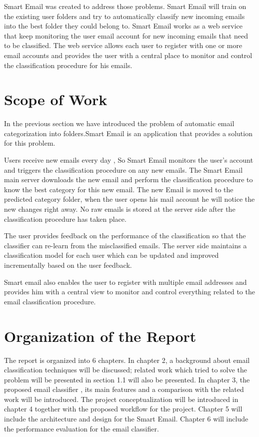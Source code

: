 	Smart Email was created to address those problems. Smart Email will train on the existing user folders and try to automatically classify new incoming emails into the best folder they could belong to. Smart Email works as a web service that keep monitoring the user email account for new incoming emails that need to be classified. The web service allows each user to register with one or more email accounts and provides the user with a central place to monitor and control the classification procedure for his emails.

\section{Scope of Work}

In the previous section we have introduced the problem of automatic email categorization into folders.Smart Email is an application that provides a solution for this problem.

Users receive new emails every day , So Smart Email monitors the user's account and triggers the classification procedure on any new emails. The Smart Email main server downloads the new email and perform the classification procedure to know the best category for this new email. The new Email is moved to the predicted category folder, when the user opens his mail account he will notice the new changes right away. No raw emails is stored at the server side after the classification procedure has taken place.

The user provides feedback on the performance of the classification so that the classifier can re-learn from the misclassified emails. The server side maintains a classification model for each user which can be updated and improved incrementally based on the user feedback.

	Smart email also enables the user to register with multiple email addresses and provides him with a central view to monitor and control everything related to the email classification procedure.


\section{Organization of the Report}

The report is organized into 6 chapters. In chapter 2, a background about email classification techniques will be discussed; related work which tried to solve the problem will be presented in section 1.1 will also be presented. In chapter 3, the proposed email classifier , its main features and a comparison with the related work will be introduced. The project conceptualization will be introduced in chapter 4 together with the proposed workflow for the project. Chapter 5 will include the architecture and design for the Smart Email. Chapter 6 will include the performance evaluation for the email classifier.

